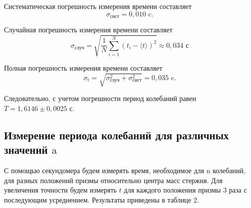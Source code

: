 \documentclass[a5paper, 11pt]{article}
\begin{document}
\par Систематическая погрешность измерения времени составляет
\begin{equation}
	\sigma_\text{сист} = 0,010\text{ c}.
\end{equation}
\par Случайная погрешность измерения времени составляет
\begin{equation}
	\sigma_\text{случ} = \sqrt{\frac{1}{N} \sum_{i=1}^{N} \left( t_i - \langle t \rangle \right)^2 } \approx 0,034 \text{ с}
\end{equation}
\par Полная погрешность измерения времени составляет
\begin{equation}
	\sigma_\text{t} = \sqrt{\sigma_\text{случ}^2+\sigma_\text{сист}^2} = 0,035\text{ c}.
\end{equation}

\par Следовательно, с учетом погрешности период колебаний равен $T = 1,6146 \pm 0,0025$ с.



\subsection{Измерение периода колебаний для различных значений $\text{a}$}

С помощью секундомера будем измерять время, необходимое для n колебаний, для разных положений призмы относительно центра масс стержня. Для увеличения точности будем измерять $t$ для каждого положения призмы 3 раза с последующим усреднением. Результаты приведены в таблице 2.
\end{document}

